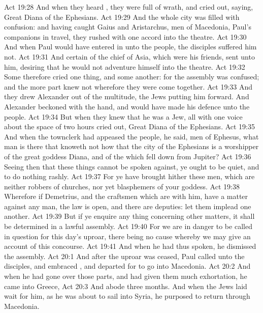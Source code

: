 \vs Act 19:28 And when they heard , they were full of wrath, and cried out, saying, Great  Diana of the Ephesians.
\vs Act 19:29 And the whole city was filled with confusion: and having caught Gaius and Aristarchus, men of Macedonia, Paul's companions in travel, they rushed with one accord into the theatre.
\vs Act 19:30 And when Paul would have entered in unto the people, the disciples suffered him not.
\vs Act 19:31 And certain of the chief of Asia, which were his friends, sent unto him, desiring  that he would not adventure himself into the theatre.
\vs Act 19:32 Some therefore cried one thing, and some another: for the assembly was confused; and the more part knew not wherefore they were come together.
\vs Act 19:33 And they drew Alexander out of the multitude, the Jews putting him forward. And Alexander beckoned with the hand, and would have made his defence unto the people.
\vs Act 19:34 But when they knew that he was a Jew, all with one voice about the space of two hours cried out, Great  Diana of the Ephesians.
\vs Act 19:35 And when the townclerk had appeased the people, he said,  men of Ephesus, what man is there that knoweth not how that the city of the Ephesians is a worshipper of the great goddess Diana, and of the  which fell down from Jupiter?
\vs Act 19:36 Seeing then that these things cannot be spoken against, ye ought to be quiet, and to do nothing rashly.
\vs Act 19:37 For ye have brought hither these men, which are neither robbers of churches, nor yet blasphemers of your goddess.
\vs Act 19:38 Wherefore if Demetrius, and the craftsmen which are with him, have a matter against any man, the law is open, and there are deputies: let them implead one another.
\vs Act 19:39 But if ye enquire any thing concerning other matters, it shall be determined in a lawful assembly.
\vs Act 19:40 For we are in danger to be called in question for this day's uproar, there being no cause whereby we may give an account of this concourse.
\vs Act 19:41 And when he had thus spoken, he dismissed the assembly.
\vs Act 20:1 And after the uproar was ceased, Paul called unto  the disciples, and embraced , and departed for to go into Macedonia.
\vs Act 20:2 And when he had gone over those parts, and had given them much exhortation, he came into Greece,
\vs Act 20:3 And  abode three months. And when the Jews laid wait for him, as he was about to sail into Syria, he purposed to return through Macedonia.
